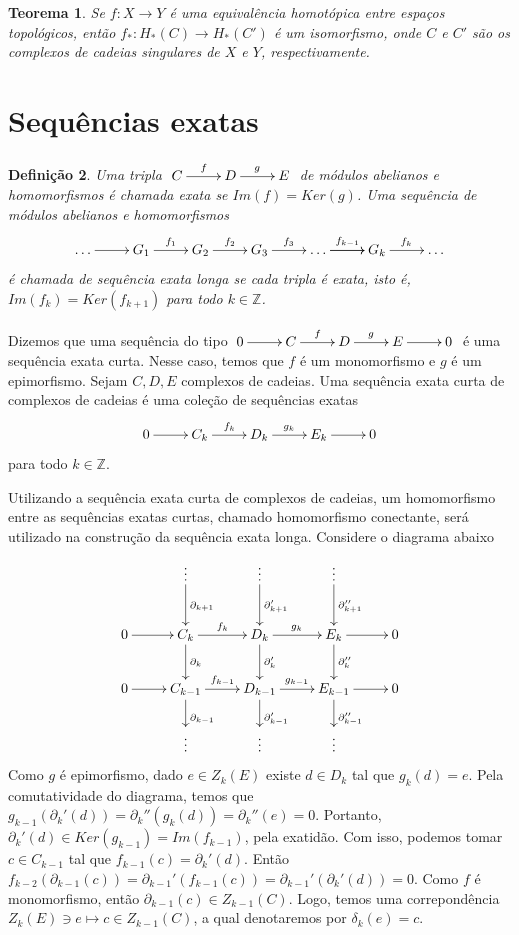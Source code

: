 \documentclass[12pt]{book}
\newtheorem{teorema}{Teorema}[section]
\newtheorem{definicao}[teorema]{Definição}
\newcommand{\bordo}[1]{\partial_{#1}}
\newcommand{\homologiaabrev}[2]{H_{#1}(#2)}
\newcommand{\inteiros}{\mathbb{Z}}
\newcommand{\kernelbordoabrev}[2]{Z_{#1}(#2)}
\begin{document}
	\begin{teorema}
		Se $f: X \to Y$ é uma equivalência homotópica entre espaços topológicos, então $f_{*}:\homologiaabrev{*}{C} \to \homologiaabrev{*}{C'}$ é um isomorfismo, onde $C$ e $C'$ são os complexos de cadeias singulares de $X$ e $Y$, respectivamente.
	\end{teorema}
	
	\section{Sequências exatas}
	\begin{definicao}
		Uma tripla $\xymatrix{C\ar[r]^{f} & D\ar[r]^{g} & E }$ de módulos abelianos e homomorfismos é chamada exata se $Im(f) = Ker(g)$. Uma sequência de módulos abelianos e homomorfismos
		$$
		\xymatrix{\dots \ar[r]& G_{1}\ar[r]^{f_{1}} & G_{2}\ar[r]^{f_{2}} & G_{3}\ar[r]^{f_{3}} & \dots \ar[r]\ar[r]^{f_{k-1}} & G_{k}\ar[r]^{f_{k}} &\dots}
		$$
		é chamada de sequência exata longa se cada tripla é exata, isto é, $Im(f_{k}) = Ker(f_{k+1})$ para todo $k\in \inteiros$.
	\end{definicao}
	
	Dizemos que uma sequência do tipo $ \xymatrix{0 \ar[r] & C\ar[r]^{f} & D\ar[r]^{g} & E \ar[r]& 0}$ é uma sequência exata curta. Nesse caso, temos que $f$ é um monomorfismo e $g$ é um epimorfismo. Sejam $C, D, E$ complexos de cadeias. Uma sequência exata curta de complexos de cadeias é uma coleção de sequências exatas
	$$ 
	\xymatrix{0 \ar[r] & C_{k}\ar[r]^{f_{k}} & D_{k}\ar[r]^{g_{k}} & E_{k} \ar[r]& 0}
	$$
	para todo $k \in \inteiros$.
	
	Utilizando a sequência exata curta de complexos de cadeias, um homomorfismo entre as sequências exatas curtas, chamado homomorfismo conectante, será utilizado na construção da sequência exata longa. Considere o diagrama abaixo
	$$
	\xymatrix{
		 & \vdots \ar[d]^{\bordo{k+1}} & \vdots \ar[d]^{\bordo{k+1}'} & \vdots \ar[d]^{\bordo{k+1}''}& 
		\\
		0 \ar[r] & C_{k}\ar[d]^{\bordo{k}}\ar[r]^{f_{k}} & D_{k}\ar[d]^{\bordo{k}'}\ar[r]^{g_{k}} & E_{k} \ar[d]^{\bordo{k}''}\ar[r]& 0
		\\
		0 \ar[r] & C_{k-1}\ar[d]^{\bordo{k-1}}\ar[r]^{f_{k-1}} & D_{k-1}\ar[d]^{\bordo{k-1}'}\ar[r]^{g_{k-1}} & E_{k-1}\ar[d]^{\bordo{k-1}''} \ar[r]& 0
		\\
		 & \vdots & \vdots  & \vdots & 
	}
	$$
	Como $g$ é epimorfismo, dado $e \in \kernelbordoabrev{k}{E}$ existe $d \in D_{k}$ tal que $g_{k}(d) = e$. Pela comutatividade do diagrama, temos que $g_{k-1}(\bordo{k}'(d)) = \bordo{k}''(g_{k}(d)) = \bordo{k}''(e) = 0$. Portanto, $\bordo{k}'(d) \in Ker(g_{k-1}) = Im(f_{k-1})$, pela exatidão. Com isso, podemos tomar $c \in C_{k-1}$ tal que $f_{k-1}(c)=\bordo{k}'(d)$. Então $f_{k-2}(\bordo{k-1}(c)) = \bordo{k-1}'(f_{k-1}(c)) = \bordo{k-1}'(\bordo{k}'(d)) = 0$. Como $f$ é monomorfismo, então $\bordo{k-1}(c) \in \kernelbordoabrev{k-1}{C}$. Logo, temos uma correpondência $\kernelbordoabrev{k}{E} \ni e \mapsto c \in \kernelbordoabrev{k-1 }{C}$, a qual denotaremos por $\delta_{k}(e) = c$. 
	
\end{document}
